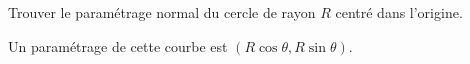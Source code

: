 \begin{exercice}\label{exoGeomAnal-0038}

Trouver le paramétrage normal du cercle de rayon $R$ centré dans l'origine. 

Un paramétrage de cette courbe est $(R\cos\theta, R\sin\theta)$.  

  

\end{exercice}
